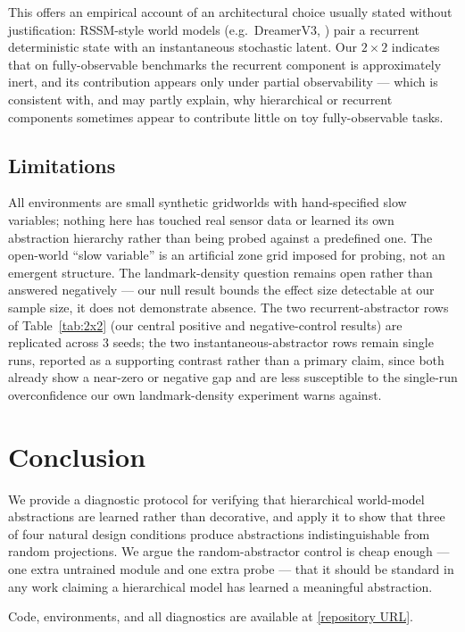 \documentclass[11pt]{article}
\begin{document}
This offers an empirical account of an architectural choice usually stated without justification: RSSM-style world models (e.g.\ DreamerV3, \citealp{hafner2023dreamerv3}) pair a recurrent deterministic state with an instantaneous stochastic latent. Our $2\times2$ indicates that on fully-observable benchmarks the recurrent component is approximately inert, and its contribution appears only under partial observability --- which is consistent with, and may partly explain, why hierarchical or recurrent components sometimes appear to contribute little on toy fully-observable tasks.

\subsection{Limitations}

All environments are small synthetic gridworlds with hand-specified slow variables; nothing here has touched real sensor data or learned its own abstraction hierarchy rather than being probed against a predefined one. The open-world ``slow variable'' is an artificial zone grid imposed for probing, not an emergent structure. The landmark-density question remains open rather than answered negatively --- our null result bounds the effect size detectable at our sample size, it does not demonstrate absence. The two recurrent-abstractor rows of Table~\ref{tab:2x2} (our central positive and negative-control results) are replicated across 3 seeds; the two instantaneous-abstractor rows remain single runs, reported as a supporting contrast rather than a primary claim, since both already show a near-zero or negative gap and are less susceptible to the single-run overconfidence our own landmark-density experiment warns against.

\section{Conclusion}

We provide a diagnostic protocol for verifying that hierarchical world-model abstractions are learned rather than decorative, and apply it to show that three of four natural design conditions produce abstractions indistinguishable from random projections. We argue the random-abstractor control is cheap enough --- one extra untrained module and one extra probe --- that it should be standard in any work claiming a hierarchical model has learned a meaningful abstraction.

Code, environments, and all diagnostics are available at \url{[repository URL]}.
\end{document}
